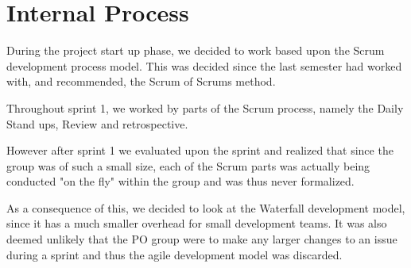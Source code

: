 \section{Internal Process}
During the project start up phase, we decided to work based upon the Scrum development process model.
This was decided since the last semester had worked with, and recommended, the Scrum of Scrums method. 

Throughout sprint 1, we worked by parts of the Scrum process, namely the Daily Stand ups, Review and retrospective. 

However after sprint 1 we evaluated upon the sprint and realized that since the group was of such a small size, each of the Scrum parts was actually being conducted "on the fly" within the group and was thus never formalized. 

As a consequence of this, we decided to look at the Waterfall development model, since it has a much smaller overhead for small development teams. 
It was also deemed unlikely that the PO group were to make any larger changes to an issue during a sprint and thus the agile development model was discarded.






